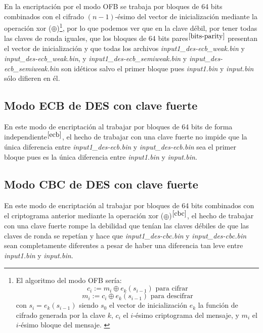 \documentclass[a4paper, 11pt]{article}
\begin{document}
		En la encriptación por el modo OFB se trabaja por bloques de 64 bits combinados con el cifrado $(n-1)$-ésimo del vector
		de inicialización mediante la operación xor ($\oplus$)\footnote{El algoritmo del modo OFB sería: \[c_i := m_i \oplus
		e_k(s_{i-1}) \text{ para cifrar}\] \[m_i := c_i \oplus e_k(s_{i-1}) \text{ para descifrar}\] con $s_i = e_k(s_{i-1})$
		siendo $s_0$ el vector de inicialización $e_k$ la función de cifrado generada por la clave $k$, $c_i$ el $i$-ésimo
		criptograma del mensaje, y $m_i$ el $i$-ésimo bloque del mensaje. \label{ofb}}, por lo que podemos ver que en la clave
		débil, por tener todas las claves de ronda iguales, que los bloques de 64 bits pares$^{\ref{bits-parity}}$ presentan el
		vector de inicialización y que todas los archivos \textit{input1\_des-ecb\_weak.bin} y \textit{input\_des-ecb\_weak.bin},
		y \textit{input1\_des-ecb\_semiweak.bin} y \textit{input\_des-ecb\_semiweak.bin} son idéticos salvo el primer bloque
		pues \textit{input1.bin} y \textit{input.bin} sólo difieren en él.
				
	\subsection{Modo ECB de DES con clave fuerte}
		En este modo de encriptación al trabajar por bloques de 64 bits de forma independiente$^{\ref{ecb}}$, el hecho de trabajar con
		una clave fuerte no impide que la única diferencia entre \textit{input1\_des-ecb.bin} y \textit{input\_des-ecb.bin}
		sea el primer bloque pues es la única diferencia entre \textit{input1.bin} y \textit{input.bin}.
		
	\subsection{Modo CBC de DES con clave fuerte}
		En este modo de encriptación al trabajar por bloques de 64 bits combinados con el criptograma anterior mediante
		la operación xor ($\oplus$)$^{\ref{cbc}}$, el hecho de trabajar con una clave fuerte rompe la debilidad que tenían las claves
		débiles de que las claves de ronda se repetían y hace que \textit{input1\_des-cbc.bin} y \textit{input\_des-cbc.bin}
		sean completamente diferentes a pesar de haber una diferencia tan leve entre \textit{input1.bin} y \textit{input.bin}.
		
\end{document}
